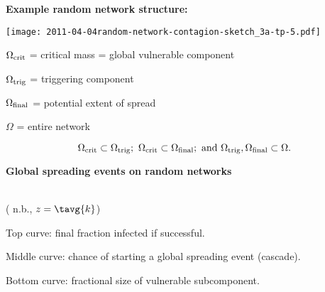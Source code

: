   


  \textbf{Example random network structure:}

      
    \texttt{[image: 2011-04-04random-network-contagion-sketch\_3a-tp-5.pdf]}
    
    
     
      $\Omega_{\textnormal{crit}}$ = critical mass = global vulnerable component
     
      $\Omega_{\textnormal{trig}}$ = triggering component
     
      $\Omega_{\textnormal{final}}$ = potential extent of spread
     
      $\Omega$ = entire network
    
    \bigskip
  $$
  \Omega_{\textnormal{crit}} 
  \subset
  \Omega_{\textnormal{trig}};
  \
  \Omega_{\textnormal{crit}} 
  \subset
  \Omega_{\textnormal{final}};
  \
  \mbox{and}
  \
  \Omega_{\textnormal{trig}},
  \Omega_{\textnormal{final}} 
  \subset
  \Omega.
  $$





  \textbf{Global spreading events on random networks}

      
    \setlength\fboxsep{0pt}
    \setlength\fboxrule{0.5pt}
    \\
    \small{( n.b., $z = \tavg{k}$)}
    
    
    
      \alert{Top curve:} final fraction infected if successful.
    
      \alert{Middle curve:} chance of starting a global spreading event (cascade).
     
      \alert{Bottom curve:} fractional size of vulnerable subcomponent.\cite{watts2002a}
    
